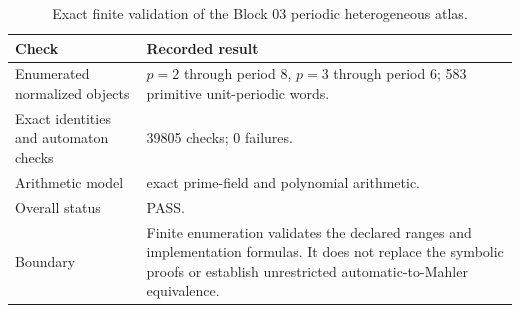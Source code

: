 \begin{table}[htbp]
\centering
\caption{Exact finite validation of the Block 03 periodic heterogeneous atlas.}
\label{tab:block03-validation}
\small
\begin{tabularx}{\textwidth}{@{}L{0.28\textwidth}Y@{}}
\toprule
Check & Recorded result\\
\midrule
Enumerated normalized objects & $p=2$ through period 8, $p=3$ through period 6; 583 primitive unit-periodic words.\\
Exact identities and automaton checks & 39805 checks; 0 failures.\\
Arithmetic model & exact prime-field and polynomial arithmetic.\\
Overall status & PASS.\\
Boundary & Finite enumeration validates the declared ranges and implementation formulas. It does not replace the symbolic proofs or establish unrestricted automatic-to-Mahler equivalence.\\
\bottomrule
\end{tabularx}
\end{table}

